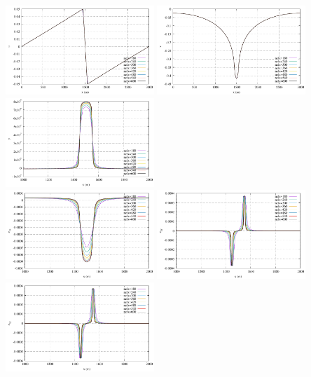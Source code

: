 \begin{center}
\includegraphics[width=5.6cm]{python_codes/fieldstone_34/results/exp4/top_profile_u.pdf}
\includegraphics[width=5.6cm]{python_codes/fieldstone_34/results/exp4/top_profile_v.pdf}
\includegraphics[width=5.6cm]{python_codes/fieldstone_34/results/exp4/top_profile_p.pdf}\\
\includegraphics[width=5.6cm]{python_codes/fieldstone_34/results/exp4/top_profile_exx.pdf}
\includegraphics[width=5.6cm]{python_codes/fieldstone_34/results/exp4/top_profile_eyy.pdf}
\includegraphics[width=5.6cm]{python_codes/fieldstone_34/results/exp4/top_profile_exy.pdf}\\

\end{center}
